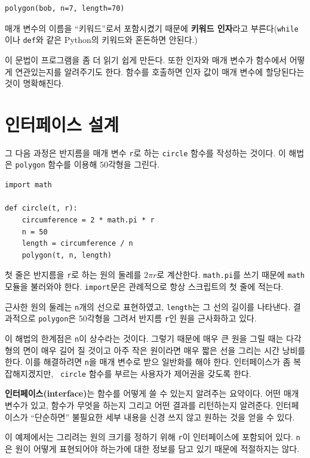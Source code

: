 \documentclass[10pt]{book}
\begin{document}
\begin{verbatim}
polygon(bob, n=7, length=70)
\end{verbatim}
%
매개 변수의 이름을 ``키워드''로서 포함시켰기 때문에 {\bf 키워드
  인자}라고 부른다({\tt while}이나 {\tt def}와 같은 Python의 키워드와
혼돈하면 안된다.)


이 문법이 프로그램을 좀 더 읽기 쉽게 만든다.  또한 인자와 매개 변수가
함수에서 어떻게 연관있는지를 알려주기도 한다.  함수를 호출하면 인자
값이 매개 변수에 할당된다는 것이 명확해진다.



\section{인터페이스 설계}

그 다음 과정은 반지름을 매개 변수 {\tt r}로 하는 {\tt circle} 함수를
작성하는 것이다.  이 해법은 {\tt polygon} 함수를 이용해 50각형을 그린다.

\begin{verbatim}
import math

def circle(t, r):
    circumference = 2 * math.pi * r
    n = 50
    length = circumference / n
    polygon(t, n, length)
\end{verbatim}
%
첫 줄은 반지름을 {\tt r}로 하는 원의 둘레를 $ 2 \pi r$로 계산한다.
{\tt math.pi}를 쓰기 때문에 {\tt math} 모듈을 불러와야 한다.
{\tt import}문은 관례적으로 항상 스크립트의 첫 줄에 적는다.

근사한 원의 둘레는 {\tt n}개의 선으로 표현하였고, {\tt length}는 그
선의 길이를 나타낸다.  결과적으로 {\tt polygon}은 50각형을 그려서
반지름 {\tt r}인 원을 근사화하고 있다.

이 해법의 한계점은 {\tt n}이 상수라는 것이다.  그렇기 때문에 매우 큰
원을 그릴 때는 다각형의 면이 매우 길어 질 것이고 아주 작은 원이라면
매우 짧은 선을 그리는 시간 낭비를 한다.  이를 해결하려면 {\tt n}을 매개
변수로 받으 일반화를 해야 한다. 인터페이스가 좀 복잡해지겠지만, {\tt
  circle} 함수를 부르는 사용자가 제어권을 갖도록 한다.

{\bf 인터페이스(interface)}는 함수를 어떻게 쓸 수 있는지 알려주는 요약이다.  어떤 매개 변수가 있고, 함수가 무엇을 하는지 그리고 어떤 결과를 리턴하는지 알려준다.  인터페이스가 ``단순하면'' 불필요한 세부 내용을 신경 쓰지 않고 원하는 것을 얻을 수 있다. 

이 예제에서는 그리려는 원의 크기를 정하기 위해 {\tt r}이 인터페이스에
포함되어 있다.  {\tt n}은 원이 어떻게 표현되어야 하는가에 대한 정보를
담고 있기 때문에 적절하지는 않다.
\end{document}

